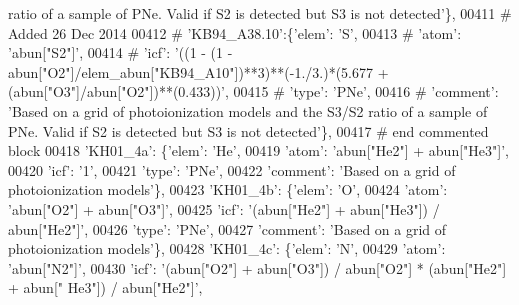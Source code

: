\begin{DoxyCode}
{       ratio of a sample of PNe. Valid if S2 is detected but S3 is not detected'\},}
00411 \textcolor{comment}{# Added 26 Dec 2014}
00412 \textcolor{comment}{#                         'KB94\_A38.10':\{'elem': 'S',}
00413 \textcolor{comment}{#                                     'atom': 'abun["S2"]',}
00414 \textcolor{comment}{#                                     'icf': '((1 - (1 -
       abun["O2"]/elem\_abun["KB94\_A10"])**3)**(-1./3.)*(5.677 + (abun["O3"]/abun["O2"])**(0.433))',}
00415 \textcolor{comment}{#                                      'type': 'PNe',}
00416 \textcolor{comment}{#                                      'comment': 'Based on a grid of photoionization models and the S3/S2
       ratio of a sample of PNe. Valid if S2 is detected but S3 is not detected'\},}
00417 \textcolor{comment}{# end commented block}
00418                          \textcolor{stringliteral}{'KH01\_4a'}: \{\textcolor{stringliteral}{'elem'}: \textcolor{stringliteral}{'He'},
00419                                      \textcolor{stringliteral}{'atom'}: \textcolor{stringliteral}{'abun["He2"] + abun["He3"]'},
00420                                      \textcolor{stringliteral}{'icf'}: \textcolor{stringliteral}{'1'},
00421                                      \textcolor{stringliteral}{'type'}: \textcolor{stringliteral}{'PNe'},
00422                                      \textcolor{stringliteral}{'comment'}: \textcolor{stringliteral}{'Based on a grid of photoionization models'}\},
00423                          \textcolor{stringliteral}{'KH01\_4b'}: \{\textcolor{stringliteral}{'elem'}: \textcolor{stringliteral}{'O'},
00424                                      \textcolor{stringliteral}{'atom'}: \textcolor{stringliteral}{'abun["O2"] + abun["O3"]'},
00425                                      \textcolor{stringliteral}{'icf'}: \textcolor{stringliteral}{'(abun["He2"] + abun["He3"]) / abun["He2"]'},
00426                                      \textcolor{stringliteral}{'type'}: \textcolor{stringliteral}{'PNe'},
00427                                      \textcolor{stringliteral}{'comment'}: \textcolor{stringliteral}{'Based on a grid of photoionization models'}\},
00428                          \textcolor{stringliteral}{'KH01\_4c'}: \{\textcolor{stringliteral}{'elem'}: \textcolor{stringliteral}{'N'},
00429                                      \textcolor{stringliteral}{'atom'}: \textcolor{stringliteral}{'abun["N2"]'},
00430                                      \textcolor{stringliteral}{'icf'}: \textcolor{stringliteral}{'(abun["O2"] + abun["O3"]) / abun["O2"] * (abun["He2"] + abun["
      He3"]) / abun["He2"]'},

\end{DoxyCode}
